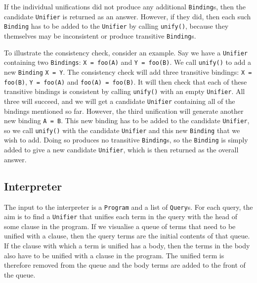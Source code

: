 \documentclass[12pt]{article}
\begin{document}
If the individual unifications did not produce any additional \verb|Binding|s, then the candidate \verb|Unifier| is returned as an answer. 
However, if they did, then each such \verb|Binding| has to be added to the \verb|Unifier| by calling \verb|unify()|, because they themselves may be inconsistent or produce transitive \verb|Binding|s.

To illustrate the consistency check, consider an example. 
Say we have a \verb|Unifier| containing two \verb|Bindings|: \verb|X = foo(A)| and \verb|Y = foo(B)|. 
We call \verb|unify()| to add a new \verb|Binding| \verb|X = Y|. 
The consistency check will add three transitive bindings: \verb|X = foo(B)|, \verb|Y = foo(A)| and \verb|foo(A) = foo(B)|. 
It will then check that each of these transitive bindings is consistent by calling \verb|unify()| with an empty \verb|Unifier|. 
All three will succeed, and we will get a candidate \verb|Unifier| containing all of the bindings mentioned so far.
However, the third unification will generate another new binding \verb|A = B|. 
This new binding has to be added to the candidate \verb|Unifier|, so we call \verb|unify()| with the candidate \verb|Unifier| and this new \verb|Binding| that we wish to add.
Doing so produces no transitive \verb|Binding|s, so the \verb|Binding| is simply added to give a new candidate \verb|Unifier|, which is then returned as the overall answer.


\subsection{Interpreter}

The input to the interpreter is a \verb|Program| and a list of \verb|Query|s. 
For each query, the aim is to find a \verb|Unifier| that unifies each term in the query with the head of some clause in the program. 
If we visualise a queue of terms that need to be unified with a clause, then the query terms are the initial contents of that queue. 
If the clause with which a term is unified has a body, then the terms in the body also have to be unified with a clause in the program.
The unified term is therefore removed from the queue and the body terms are added to the front of the queue.
\end{document}

